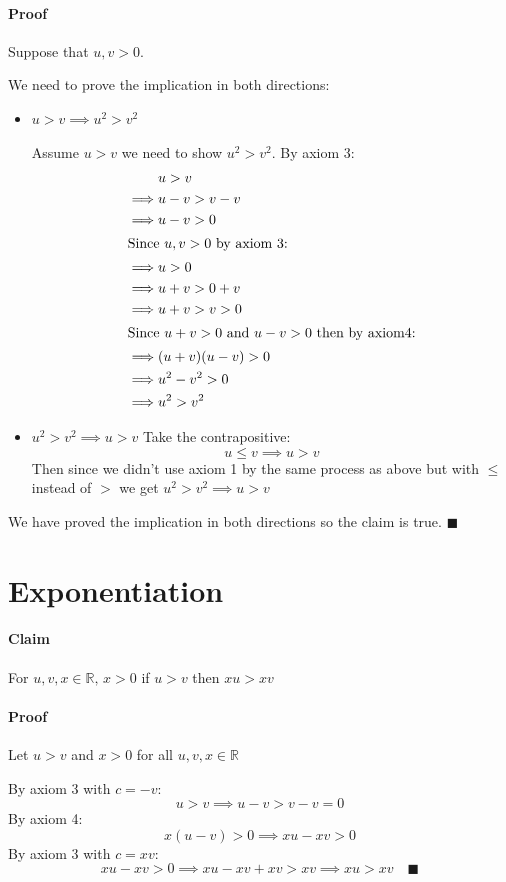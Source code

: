 \documentclass{article}
\newcommand{\bb}[1]{\mathbb{#1}}
\begin{document}
\paragraph{Proof} Suppose that \(u,v>0\).

We need to prove the implication in both directions:
\begin{itemize}
\item \(u>v\implies u^2>v^2\)

Assume \(u>v\) we need to show \(u^2>v^2\). By axiom 3:
\begin{align*}
&u>v\\
\implies&u-v>v-v\\
\implies&u-v>0\\
\intertext{Since \(u,v>0\) by axiom 3:}
\implies&u>0\\
\implies&u+v>0+v\\
\implies&u+v>v>0\\
\intertext{Since \(u+v>0\) and \(u-v>0\) then by axiom4:}
\implies&(u+v)(u-v)>0\\
\implies&u^2-v^2>0\\
\implies&u^2>v^2
\end{align*}
\item \(u^2>v^2\implies u>v\)
Take the contrapositive:
\[u\le v\implies u>v\]
Then since we didn't use axiom 1 by the same process as above but with \(\le\) instead of \(>\) we get \(u^2>v^2\implies u>v\)
\end{itemize}
We have proved the implication in both directions so the claim is true. \(\blacksquare\)

\section{Exponentiation}

\paragraph{Claim} For \(u,v,x\in\bb R,\,x>0\) if \(u>v\) then \(xu>xv\)

\paragraph{Proof} Let \(u>v\) and \(x>0\) for all \(u,v,x\in\bb R\)

By axiom 3 with \(c=-v\):
\[u>v\implies u-v>v-v=0\]
By axiom 4:
\[x(u-v)>0\implies xu-xv>0\]
By axiom 3 with \(c=xv\): 
\[xu-xv>0\implies xu-xv+xv>xv\implies xu>xv\quad \blacksquare\]
\end{document}
